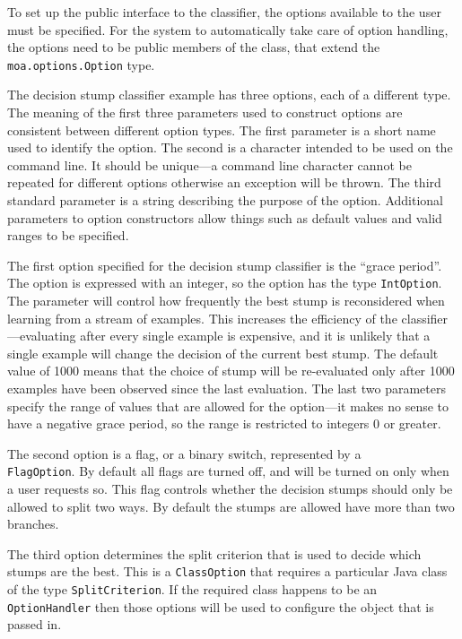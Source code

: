 \documentclass[a4paper,12pt,twoside]{book}
\begin{document}
To set up the public interface to the classifier, the options available to the user must be specified. For the system to automatically take care of option handling, the options need to be public members of the class, that extend the \verb+moa.options.Option+ type.

The decision stump classifier example has three options, each of a different type.
The meaning of the first three parameters used to construct options are consistent between different option types. The first parameter is a short name used to identify the option. The second is a character intended to be used on the command line. It should be unique---a command line character cannot be repeated for different options otherwise an exception will be thrown. The third standard parameter is a string describing the purpose of the option. Additional parameters to option constructors allow things such as default values and valid ranges to be specified.

The first option specified for the decision stump classifier is the ``grace period''. The option is expressed with an integer, so the option has the type \verb+IntOption+. The parameter will control how frequently the best stump is reconsidered when learning from a stream of examples. This increases the efficiency of the classifier---evaluating after every single example is expensive, and it is unlikely that a single example will change the decision of the current best stump. The default value of 1000 means that the choice of stump will be re-evaluated only after 1000 examples have been observed since the last evaluation. The last two parameters specify the range of values that are allowed for the option---it makes no sense to have a negative grace period, so the range is restricted to integers 0 or greater.

The second option is a flag, or a binary switch, represented by a \\ \verb+FlagOption+. By default all flags are turned off, and will be turned on only when a user requests so. This flag controls whether the decision stumps should only be allowed to split two ways. By default the stumps are allowed have more than two branches.

The third option determines the split criterion that is used to decide which stumps are the best. This is a \verb+ClassOption+ that requires a particular Java class of the type \verb+SplitCriterion+. If the required class happens to be an \verb+OptionHandler+ then those options will be used to configure the object that is passed in.
\end{document}
